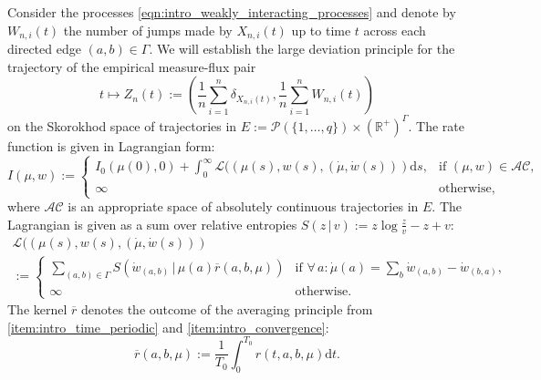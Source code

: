 \documentclass[a4paper]{article}
\newcommand{\cA}{\mathcal{A}}
\newcommand{\cC}{\mathcal{C}}
\newcommand{\cL}{\mathcal{L}}
\newcommand{\cP}{\mathcal{P}}
\newcommand{\bR}{\mathbb{R}}
\newcommand{\dd}{ \mathrm{d}}
\numberwithin{equation}{section}
\theoremstyle{definition}
\begin{document}
Consider the processes \eqref{eqn:intro_weakly_interacting_processes} and denote by $W_{n,i}(t)$ the number of jumps made by $X_{n,i}(t)$ up to time $t$ across each directed edge $(a,b) \in \Gamma$.  We will establish the large deviation principle for the trajectory of the empirical measure-flux pair
\begin{equation} \label{eqn:intro_pair_of_processes}
	t \mapsto Z_n(t) := \left(\frac{1}{n} \sum_{i=1}^n \delta_{X_{n,i}(t)},\frac{1}{n} \sum_{i=1}^n W_{n,i}(t)\right)
\end{equation}
on the Skorokhod space of trajectories in $E := \cP(\{1,\dots,q\}) \times (\bR^+)^{\Gamma}$. The rate function is given in Lagrangian form: 
\begin{equation*}
	I(\mu,w) := \begin{cases}
		I_0(\mu(0),0) + \int_0^\infty \cL((\mu(s),w(s),(\dot{\mu},\dot{w}(s))) \dd s, & \text{if } (\mu,w) \in \cA\cC, \\
		\infty & \text{otherwise},
	\end{cases}
\end{equation*}
where $\cA\cC$ is an appropriate space of absolutely continuous trajectories in $E$. The Lagrangian is given as a sum over relative entropies $S(z \, | \, v)  := z \log \frac{z}{v} - z + v$:
\begin{multline}
	\cL((\mu(s),w(s),(\dot{\mu},\dot{w}(s))) \label{eqn:intro_lagrangian} \\
	:= \begin{cases}
		\sum_{(a,b) \in \Gamma} S\left( \dot{w}_{(a,b)} \, | \, \mu(a) \overline{r}(a,b,\mu)\right) & \text{if } \forall \, a: \dot{\mu}(a) =\sum_b \dot{w}_{(a,b)} - \dot{w}_{(b,a)}, \\
		\infty & \text{otherwise}.
	\end{cases}  
\end{multline}
The kernel $\overline{r}$ denotes the outcome of the averaging principle from \ref{item:intro_time_periodic} and \ref{item:intro_convergence}:
\begin{equation*}
	\overline{r}(a,b,\mu) := \frac{1}{T_0} \int_0^{T_0} r(t,a,b,\mu) \dd t.
\end{equation*}
\end{document}

